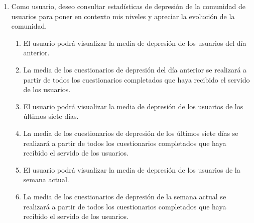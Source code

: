         \begin{enumerate}[resume=req-usuario,label=\textbf{\texttt{RU-\arabic*}}]
            \item \label{req:usuario:comunidad_depresion} Como usuario, deseo consultar estadísticas de depresión de la comunidad de usuarios para poner en contexto mis niveles y apreciar la evolución de la comunidad.
            \begin{enumerate}[resume=req-funcionales,label=\textbf{\texttt{RF-\arabic*}}]
                \item \label{req:funcionales:comunidad_depresion_dia_anterior_ver} El usuario podrá visualizar la media de depresión de los usuarios del día anterior.
                \item \label{req:funcionales:comunidad_depresion_dia_anterior_criterio} La media de los cuestionarios de depresión del día anterior se realizará a partir de todos los cuestionarios completados que haya recibido el servido de los usuarios.
                \item \label{req:funcionales:comunidad_depresion_siete_dias_ver} El usuario podrá visualizar la media de depresión de los usuarios de los últimos siete días.
                \item \label{req:funcionales:comunidad_depresion_siete_dias_criterio} La media de los cuestionarios de depresión de los últimos siete días se realizará a partir de todos los cuestionarios completados que haya recibido el servido de los usuarios.
                \item \label{req:funcionales:comunidad_depresion_semana_actual_ver} El usuario podrá visualizar la media de depresión de los usuarios de la semana actual.
                \item \label{req:funcionales:comunidad_depresion_semana_actual_criterio} La media de los cuestionarios de depresión de la semana actual se realizará a partir de todos los cuestionarios completados que haya recibido el servido de los usuarios.
            \end{enumerate}
        \end{enumerate}
